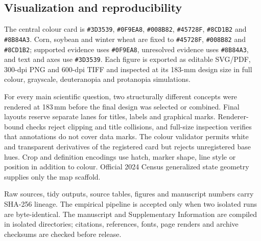 \subsection{Visualization and reproducibility}
The central colour card is \texttt{\#3D3539}, \texttt{\#0F9EA8}, \texttt{\#008B82}, \texttt{\#45728F}, \texttt{\#8CD1B2} and \texttt{\#8B84A3}. Corn, soybean and winter wheat are fixed to \texttt{\#45728F}, \texttt{\#008B82} and \texttt{\#8CD1B2}; supported evidence uses \texttt{\#0F9EA8}, unresolved evidence uses \texttt{\#8B84A3}, and text and axes use \texttt{\#3D3539}. Each figure is exported as editable SVG/PDF, 300-dpi PNG and 600-dpi TIFF and inspected at its 183-mm design size in full colour, grayscale, deuteranopia and protanopia simulations.

For every main scientific question, two structurally different concepts were rendered at 183\,mm before the final design was selected or combined. Final layouts reserve separate lanes for titles, labels and graphical marks. Renderer-bound checks reject clipping and title collisions, and full-size inspection verifies that annotations do not cover data marks. The colour validator permits white and transparent derivatives of the registered card but rejects unregistered base hues. Crop and definition encodings use hatch, marker shape, line style or position in addition to colour. Official 2024 Census generalized state geometry supplies only the map scaffold.

Raw sources, tidy outputs, source tables, figures and manuscript numbers carry SHA-256 lineage. The empirical pipeline is accepted only when two isolated runs are byte-identical. The manuscript and Supplementary Information are compiled in isolated directories; citations, references, fonts, page renders and archive checksums are checked before release.
